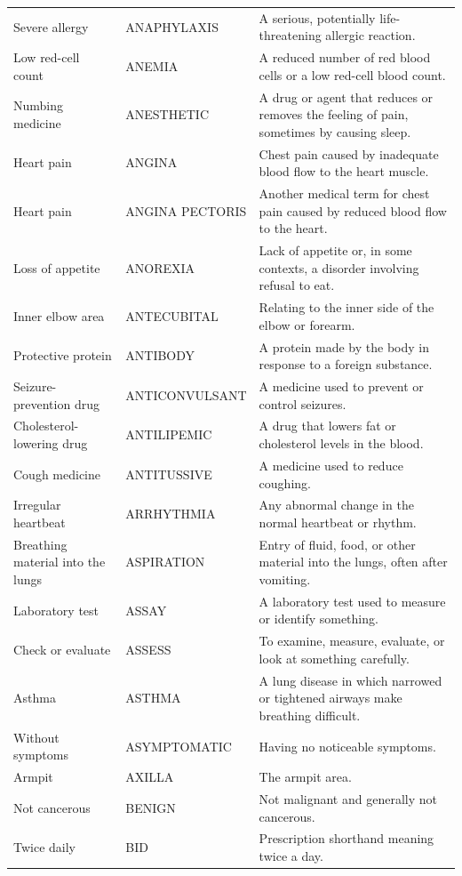 \begin{longtable}{>{\raggedright\arraybackslash}p{} >{\raggedright\arraybackslash}p{} >{\raggedright\arraybackslash}p{}}
Severe allergy & ANAPHYLAXIS & A serious, potentially life-threatening allergic reaction. \\
Low red-cell count & ANEMIA & A reduced number of red blood cells or a low red-cell blood count. \\
Numbing medicine & ANESTHETIC & A drug or agent that reduces or removes the feeling of pain, sometimes by causing sleep. \\
Heart pain & ANGINA & Chest pain caused by inadequate blood flow to the heart muscle. \\
Heart pain & ANGINA PECTORIS & Another medical term for chest pain caused by reduced blood flow to the heart. \\
Loss of appetite & ANOREXIA & Lack of appetite or, in some contexts, a disorder involving refusal to eat. \\
Inner elbow area & ANTECUBITAL & Relating to the inner side of the elbow or forearm. \\
Protective protein & ANTIBODY & A protein made by the body in response to a foreign substance. \\
Seizure-prevention drug & ANTICONVULSANT & A medicine used to prevent or control seizures. \\
Cholesterol-lowering drug & ANTILIPEMIC & A drug that lowers fat or cholesterol levels in the blood. \\
Cough medicine & ANTITUSSIVE & A medicine used to reduce coughing. \\
Irregular heartbeat & ARRHYTHMIA & Any abnormal change in the normal heartbeat or rhythm. \\
Breathing material into the lungs & ASPIRATION & Entry of fluid, food, or other material into the lungs, often after vomiting. \\
Laboratory test & ASSAY & A laboratory test used to measure or identify something. \\
Check or evaluate & ASSESS & To examine, measure, evaluate, or look at something carefully. \\
Asthma & ASTHMA & A lung disease in which narrowed or tightened airways make breathing difficult. \\
Without symptoms & ASYMPTOMATIC & Having no noticeable symptoms. \\
Armpit & AXILLA & The armpit area. \\
Not cancerous & BENIGN & Not malignant and generally not cancerous. \\
Twice daily & BID & Prescription shorthand meaning twice a day. \\

\end{longtable}

